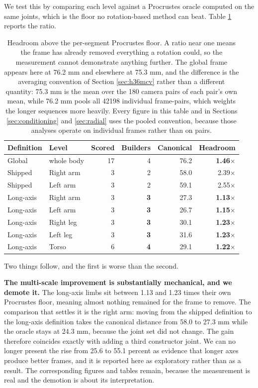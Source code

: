 \documentclass[12pt,a4paper]{report}
\begin{document}
We test this by comparing each level against a Procrustes oracle computed on the same joints, which is the floor no rotation-based method can beat. Table \ref{tab:circularity} reports the ratio.

\begin{table}[htbp]
\centering
\caption[Headroom above the per-segment Procrustes floor]{Headroom above the per-segment Procrustes floor. A ratio near one means the frame has already removed everything a rotation could, so the measurement cannot demonstrate anything further. The global frame appears here at 76.2 mm and elsewhere at 75.3 mm, and the difference is the averaging convention of Section \ref{sec:h36mcv} rather than a different quantity: 75.3 mm is the mean over the 180 camera pairs of each pair's own mean, while 76.2 mm pools all 42198 individual frame-pairs, which weights the longer sequences more heavily. Every figure in this table and in Sections \ref{sec:conditioning} and \ref{sec:radial} uses the pooled convention, because those analyses operate on individual frames rather than on pairs.}
\label{tab:circularity}
{\fontsize{10}{12}\selectfont
\begin{tabular}{llrrrr}
\hline
\textbf{Definition} & \textbf{Level} & \textbf{Scored} & \textbf{Builders} & \textbf{Canonical} & \textbf{Headroom} \\
\hline
Global & whole body & 17 & 4 & 76.2 & \textbf{1.46$\times$} \\
\hline
Shipped & Right arm & 3 & 2 & 58.0 & 2.39$\times$ \\
Shipped & Left arm & 3 & 2 & 59.1 & 2.55$\times$ \\
Long-axis & Right arm & 3 & \textbf{3} & 27.3 & \textbf{1.13$\times$} \\
Long-axis & Left arm & 3 & \textbf{3} & 26.7 & \textbf{1.15$\times$} \\
Long-axis & Right leg & 3 & \textbf{3} & 30.1 & \textbf{1.23$\times$} \\
Long-axis & Left leg & 3 & \textbf{3} & 31.6 & \textbf{1.23$\times$} \\
Long-axis & Torso & 6 & \textbf{4} & 29.1 & \textbf{1.22$\times$} \\
\hline
\end{tabular}}
\end{table}

Two things follow, and the first is worse than the second.

\textbf{The multi-scale improvement is substantially mechanical, and we demote it.} The long-axis limbs sit between 1.13 and 1.23 times their own Procrustes floor, meaning almost nothing remained for the frame to remove. The comparison that settles it is the right arm: moving from the shipped definition to the long-axis definition takes the canonical distance from 58.0 to 27.3 mm while the oracle stays at 24.3 mm, because the joint set did not change. The gain therefore coincides exactly with adding a third constructor joint. We can no longer present the rise from 25.6 to 55.1 percent as evidence that longer axes produce better frames, and it is reported here as exploratory rather than as a result. The corresponding figures and tables remain, because the measurement is real and the demotion is about its interpretation.
\end{document}
